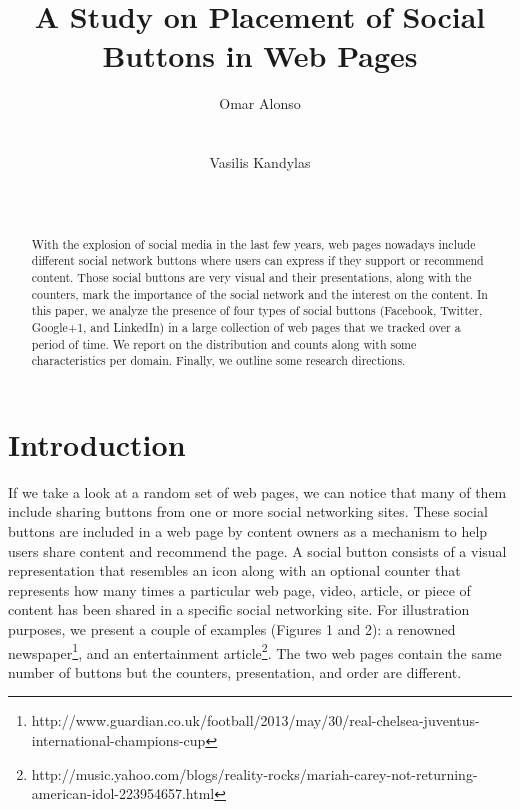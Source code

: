 \documentclass{sig-alternate}
\begin{document}
\title{A Study on Placement of Social Buttons in Web Pages}

\author{
\alignauthor Omar Alonso \\
 \\
 \\
\alignauthor Vasilis Kandylas \\
 \\
 \\
}
\date{}

\maketitle
\begin{abstract}
With the explosion of social media in the last few years, web pages nowadays include different social network buttons where users can express if they support or recommend content. Those social buttons are very visual and their presentations, along with the counters, mark the importance of the social network and the interest on the content. In this paper, we analyze the presence of four types of social buttons (Facebook, Twitter, Google+1, and LinkedIn) in a large collection of web pages that we tracked over a period of time. We report on the distribution and counts along with some characteristics per domain. Finally, we outline some research directions. \end{abstract}





\section{Introduction}

If we take a look at a random set of web pages, we can notice that many of them include sharing buttons from one or more social networking sites. These social buttons are included in a web page by content owners as a mechanism to help users share content and recommend the page. A social button consists of a visual representation that resembles an icon along with an optional counter that represents how many times a particular web page, video, article, or piece of content has been shared in a specific social networking site.  
For illustration purposes, we present a couple of examples (Figures 1 and 2):  a renowned newspaper\footnote{http://www.guardian.co.uk/football/2013/may/30/real-chelsea-juventus-international-champions-cup}, and 
an entertainment article\footnote{http://music.yahoo.com/blogs/reality-rocks/mariah-carey-not-returning-american-idol-223954657.html}. The two web pages contain the same number of buttons but the counters, presentation, and order are different. 
\end{document}
